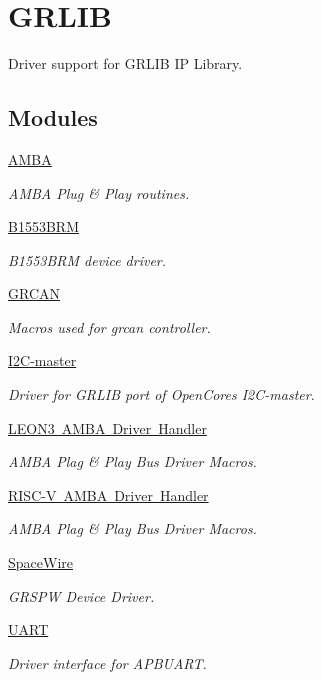 \hypertarget{group__RTEMSBSPsSharedGRLIB}{}\section{G\+R\+L\+IB}
\label{group__RTEMSBSPsSharedGRLIB}


Driver support for G\+R\+L\+IB IP Library.  


\subsection*{Modules}
\begin{DoxyCompactItemize}
\item 
\mbox{\hyperlink{group__amba}{A\+M\+BA}}
\begin{DoxyCompactList}\small\item\em A\+M\+BA Plug \& Play routines. \end{DoxyCompactList}\item 
\mbox{\hyperlink{group__B1553BRM}{B1553\+B\+RM}}
\begin{DoxyCompactList}\small\item\em B1553\+B\+RM device driver. \end{DoxyCompactList}\item 
\mbox{\hyperlink{group__can}{G\+R\+C\+AN}}
\begin{DoxyCompactList}\small\item\em Macros used for grcan controller. \end{DoxyCompactList}\item 
\mbox{\hyperlink{group__i2c}{I2\+C-\/master}}
\begin{DoxyCompactList}\small\item\em Driver for G\+R\+L\+IB port of Open\+Cores I2\+C-\/master. \end{DoxyCompactList}\item 
\mbox{\hyperlink{group__RTEMSBSPsSPARCLEON3AMBA}{L\+E\+O\+N3 A\+M\+B\+A Driver Handler}}
\begin{DoxyCompactList}\small\item\em A\+M\+BA Plag \& Play Bus Driver Macros. \end{DoxyCompactList}\item 
\mbox{\hyperlink{group__RTEMSBSPsRISCVGRLIBAMBA}{R\+I\+S\+C-\/\+V A\+M\+B\+A Driver Handler}}
\begin{DoxyCompactList}\small\item\em A\+M\+BA Plag \& Play Bus Driver Macros. \end{DoxyCompactList}\item 
\mbox{\hyperlink{group__spw}{Space\+Wire}}
\begin{DoxyCompactList}\small\item\em G\+R\+S\+PW Device Driver. \end{DoxyCompactList}\item 
\mbox{\hyperlink{group__uart}{U\+A\+RT}}
\begin{DoxyCompactList}\small\item\em Driver interface for A\+P\+B\+U\+A\+RT. \end{DoxyCompactList}\end{DoxyCompactItemize}
